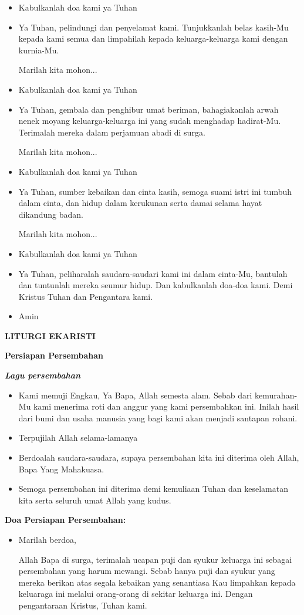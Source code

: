 \documentclass[a5paper,headsepline,titlepage,10pt,normalheadings,DIVcalc]{scrbook}
\makeatletter
\newcommand{\judul}[1]{%
  {\parindent \z@ \centering \normalfont
    \interlinepenalty\@M \Large \bfseries #1\par\nobreak \vskip 20\p@ }}
\newcommand{\subjudul}[1]{%
  {\parindent \z@ \normalfont
    \interlinepenalty\@M \bfseries #1\par\nobreak \vskip 20\p@ }}
\newcommand{\lagu}[1]{%
  {\parindent \z@ \normalfont
    \interlinepenalty\@M \bfseries \emph{#1}\par\nobreak \vskip 20\p@ }}
\newcommand{\BU}[1]{\begin{itemize} \item[U:] #1 \end{itemize}}
\newcommand{\BI}[1]{\begin{itemize} \item[I:] #1 \end{itemize}}
\newcommand{\BP}[1]{\begin{itemize} \item[P:] #1 \end{itemize}}
\makeatother
\begin{document}
\BU{Kabulkanlah doa kami ya Tuhan}


\BP{Ya Tuhan, pelindungi dan penyelamat kami. Tunjukkanlah belas kasih-Mu kepada kami semua dan limpahilah kepada keluarga-keluarga kami dengan kurnia-Mu. 


Marilah kita mohon...}

\BU{Kabulkanlah doa kami ya Tuhan}

\BP{Ya Tuhan, gembala dan penghibur umat beriman, bahagiakanlah arwah nenek moyang keluarga-keluarga ini yang sudah menghadap hadirat-Mu. Terimalah mereka dalam perjamuan abadi di surga. 


Marilah kita mohon...}

\BU{Kabulkanlah doa kami ya Tuhan}

\BP{Ya Tuhan, sumber kebaikan dan cinta kasih, semoga suami istri ini tumbuh dalam cinta, dan hidup dalam kerukunan serta damai selama hayat dikandung badan. 


Marilah kita mohon...}

\BU{Kabulkanlah doa kami ya Tuhan}

\BI{Ya Tuhan, peliharalah saudara-saudari kami ini dalam cinta-Mu, bantulah dan
tuntunlah mereka seumur hidup. Dan kabulkanlah doa-doa kami. Demi Kristus Tuhan
dan Pengantara kami.}

\BU{Amin}

\judul{LITURGI EKARISTI}

\subjudul{Persiapan Persembahan}

\lagu{Lagu persembahan}

\BI{Kami memuji Engkau, Ya Bapa, Allah semesta alam. Sebab dari kemurahan-Mu kami menerima roti dan anggur yang kami persembahkan ini. Inilah hasil dari bumi dan usaha manusia yang bagi kami akan menjadi santapan rohani.}

\BU{Terpujilah Allah selama-lamanya}

\BI{Berdoalah saudara-saudara, supaya persembahan kita ini diterima oleh Allah, Bapa Yang Mahakuasa.}

\BU{Semoga persembahan ini diterima demi kemuliaan Tuhan dan keselamatan kita serta seluruh umat Allah yang kudus.}

\subjudul{Doa Persiapan Persembahan:}

\BI{Marilah berdoa,

Allah Bapa di surga, terimalah ucapan puji dan syukur keluarga ini sebagai persembahan yang harum mewangi. Sebab hanya puji dan syukur yang mereka berikan atas segala kebaikan yang senantiasa Kau limpahkan kepada keluaraga ini melalui orang-orang di sekitar keluarga ini. Dengan pengantaraan Kristus, Tuhan kami.}
\end{document}
